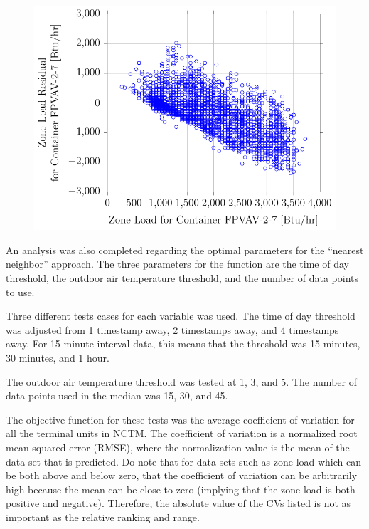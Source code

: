 \begin{figure}
\centering
\includegraphics[]{Plots/2016-09-14-1020-ZoneLoadResidualforContainerFPVAV27vsZoneLoadforContainerFPVAV27.pdf}
\caption{  }
\label{fig:2016-09-14-1020-ZoneLoadResidualforContainerFPVAV27vsZoneLoadforContainerFPVAV27}
\end{figure}


An analysis was also completed regarding the optimal parameters for the
``nearest neighbor'' approach. The three parameters for the function are
the time of day threshold, the outdoor air temperature threshold, and the
number of data points to use.

Three different tests cases for each variable was used. The time of day
threshold was adjusted from 1 timestamp away, 2 timestamps away, and 4
timestamps away. For 15 minute interval data, this means that the
threshold was 15 minutes, 30 minutes, and 1 hour. 

The outdoor air temperature threshold was tested at \SI{1}{\degreeF},
\SI{3}{\degreeF}, and \SI{5}{\degF}. The number of data points used in
the median was 15, 30, and 45. 

The objective function for these tests was the average coefficient of
variation for all the terminal units in NCTM. The coefficient of
variation is a normalized root mean squared error (RMSE), where the
normalization value is the mean of the data set that is predicted. Do note that
for data sets such as zone load which can be both above and below zero,
that the coefficient of variation can be arbitrarily high because
the mean can be close to zero (implying that the zone load is both
positive and negative). Therefore, the absolute value of the CVs listed
is not as important as the relative ranking and range. 

